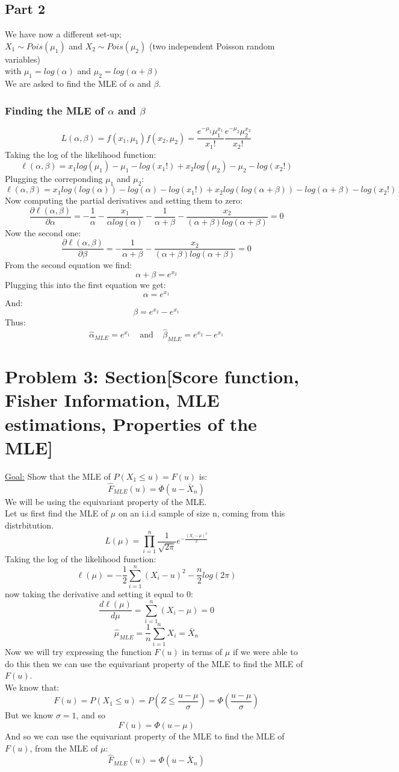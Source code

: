\documentclass[12pt]{article}
\begin{document}
\subsection*{Part 2}
We have now a different set-up;\\
$X_1 \sim Pois(\mu_1)$ and $X_2 \sim Pois(\mu_2)$ (two independent Poisson random variables)\\
with $\mu_1 = log(\alpha)$ and $\mu_2 = log(\alpha + \beta)$\\
We are asked to find the MLE of $\alpha$ and $\beta$.
\subsubsection*{Finding the MLE of $\alpha$ and $\beta$}
\[
L(\alpha,\beta) = f(x_1,\mu_1)f(x_2,\mu_2) = \frac{e^{-\mu_1}\mu_1^{x_1}}{x_1!}\frac{e^{-\mu_2}\mu_2^{x_2}}{x_2!}
\]
Taking the log of the likelihood function:
\[
\ell(\alpha,\beta) = x_1log(\mu_1) - \mu_1 - log(x_1!) + x_2log(\mu_2) - \mu_2 - log(x_2!)
\]
Plugging the correponding $\mu_1$ and $\mu_2$:
\[
\ell(\alpha,\beta) = x_1log(log(\alpha)) - log(\alpha) - log(x_1!) + x_2log(log(\alpha + \beta)) - log(\alpha + \beta) - log(x_2!)
\]
Now computing the partial derivatives and setting them to zero:
\[
\frac{\partial \ell(\alpha,\beta)}{\partial \alpha} = -\frac{1}{\alpha} -\frac{x_1}{\alpha log(\alpha)}-\frac{1}{\alpha + \beta} - \frac{x_2}{(\alpha + \beta) log(\alpha + \beta)} = 0
\]
Now the second one: 
\[
\frac{\partial \ell(\alpha,\beta)}{\partial \beta} = -\frac{1}{\alpha + \beta} - \frac{x_2}{(\alpha + \beta) log(\alpha + \beta)} = 0
\]
From the second  equation we find: 
\[
\alpha + \beta = e^{x_2}
\]
Plugging this into the first equation we get:
\[
\alpha = e^{x_1}
\]
And: 
\[
\beta = e^{x_2} - e^{x_1}
\]
Thus: 
\[
\hat{\alpha}_{MLE} = e^{x_1} \ \ \ \ \ \text{and} \ \ \ \ \ \hat{\beta}_{MLE} = e^{x_2} - e^{x_1}
\]
\section*{Problem 3: Section[Score function, Fisher Information, MLE estimations, Properties of the MLE]}
\underline{Goal:} Show that the MLE of $P(X_1 \leq u)= F(u)$ is: 
\[
\hat{F}_{MLE}(u) = \Phi(u-\bar{X}_n)
\]
We will be using the equivariant property of the MLE.\\ 
Let us first find the MLE of $\mu$ on an i.i.d  sample of size n, coming from this distrbitution. 
\[
L(\mu) = \prod_{i=1}^{n} \frac{1}{\sqrt{2\pi}} e^{-\frac{(X_i-\mu)^2}{2}}
\]
Taking the log of the likelihood function:
\[
\ell(\mu) = -\frac{1}{2}\sum_{i=1}^{n}(X_i-u)^2 - \frac{n}{2}log(2\pi)
\]
now taking the derivative and setting it equal to 0: 
\[
\frac{d\ell (\mu)}{d\mu} = \sum_{i=1}^{n}(X_i-\mu) = 0
\]
\[
\hat{\mu}_{MLE} = \frac{1}{n}\sum_{i=1}^{n} X_i = \bar{X}_n
\]
Now we will try expressing the function $F(u)$ in terms of $\mu$ if we were able to do this then we can use the equivariant property of the MLE to find the MLE of $F(u)$.\\
We know that:
\[
  F(u) = P(X_1 \leq u) =P(Z\leq \frac{u-\mu}{\sigma}) =\Phi(\frac{u-\mu}{\sigma})
\]
But we know $\sigma = 1$, and so 
\[
F(u) = \Phi(u-\mu)
\]
And so we can use the equivariant property of the MLE to find the MLE of $F(u)$, from the MLE of $\mu$:
\[
\hat{F}_{MLE}(u) = \Phi(u-\bar{X}_n)
\]
\end{document}
